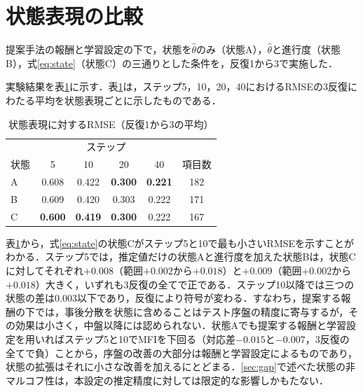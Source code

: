 \documentclass[a4paper,12pt,oneside,openany]{jsbook}
\begin{document}
\section{状態表現の比較}\label{sec:stateexp}

提案手法の報酬と学習設定の下で，状態を$\hat\theta$のみ（状態A），$\hat\theta$と進行度（状態B），式\eqref{eq:state}（状態C）の三通りとした条件を，反復1から3で実施した．

実験結果を表\ref{tab:state}に示す．表\ref{tab:state}は，ステップ5，10，20，40におけるRMSEの3反復にわたる平均を状態表現ごとに示したものである．

\begin{table}[t]
\centering
\caption{状態表現に対するRMSE（反復1から3の平均）}
\label{tab:state}
\footnotesize
\begin{tabular}{lccccc}
\hline
 & \multicolumn{4}{c}{ステップ} & \\
状態 & 5 & 10 & 20 & 40 & 項目数\\
\hline
A & 0.608 & 0.422 & \textbf{0.300} & \textbf{0.221} & 182\\
B & 0.609 & 0.420 & 0.303 & 0.222 & 171\\
C & \textbf{0.600} & \textbf{0.419} & \textbf{0.300} & 0.222 & 167\\
\hline
\end{tabular}
\end{table}

表\ref{tab:state}から，式\eqref{eq:state}の状態Cがステップ5と10で最も小さいRMSEを示すことがわかる．ステップ5では，推定値だけの状態Aと進行度を加えた状態Bは，状態Cに対してそれぞれ$+0.008$（範囲$+0.002$から$+0.018$）と$+0.009$（範囲$+0.002$から$+0.018$）大きく，いずれも3反復の全てで正である．ステップ10以降では三つの状態の差は0.003以下であり，反復により符号が変わる．すなわち，提案する報酬の下では，事後分散を状態に含めることはテスト序盤の精度に寄与するが，その効果は小さく，中盤以降には認められない．状態Aでも提案する報酬と学習設定を用いればステップ5と10でMFIを下回る（対応差$-0.015$と$-0.007$，3反復の全てで負）ことから，序盤の改善の大部分は報酬と学習設定によるものであり，状態の拡張はそれに小さな改善を加えるにとどまる．\ref{sec:gap}で述べた状態の非マルコフ性は，本設定の推定精度に対しては限定的な影響しかもたない．
\end{document}
